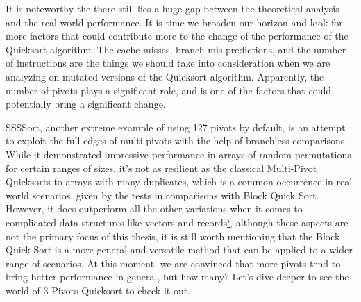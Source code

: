 \documentclass{article}
\begin{document}
It is noteworthy the there still lies a huge gap between the theoretical analysis and the real-world performance. It is time we broaden our horizon and look for more factors that could contribute more to the change of the performance of the Quicksort algorithm.
The cache misses, branch mis-predictions, and the number of instructions are the things we should take into consideration when we are analyzing on mutated versions of the Quicksort algorithm.
Apparently, the number of pivots plays a significant role, and is one of the factors that could potentially bring a significant change. 

SSSSort, another extreme example of using 127 pivots by default, is an attempt to exploit the full edges of multi pivots with the help of branchless comparisons. While it demonstrated impressive performance in arrays of random permutations for certain ranges of sizes,
it's not as resilient as the classical Multi-Pivot Quicksorts to arrays with many duplicates, which is a common occurrence in real-world scenarios, given by the tests in comparisons with Block Quick Sort\cite{BlockQuickSort}. However, it does outperform all the other variations when it comes to complicated
data structures like vectors and records\hyperlink{ref:record}{`}, although these aspects are not the primary focus of this thesis, it is still worth mentioning that the Block Quick Sort is a more general and versatile method that can be applied to a wider range of scenarios. At this moment, we are convinced that more pivots tend to bring better performance in general, but how many?
Let's dive deeper to see the world of 3-Pivots Quicksort to check it out.
\end{document}

